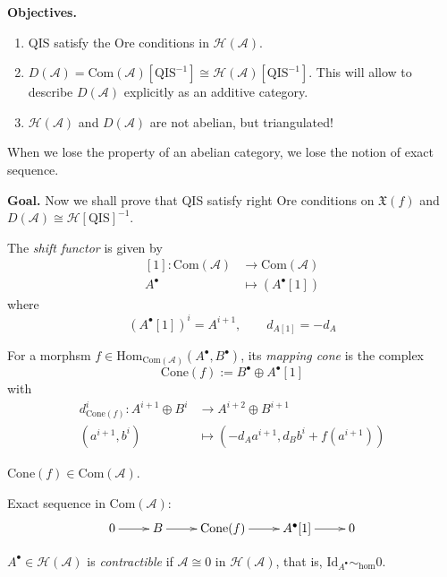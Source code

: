 {\bf Objectives.}
\begin{enumerate}
\item QIS satisfy the Ore conditions in
$\mathcal{H}(\mathcal{A})$.
\item
$D(\mathcal{A})=\text{Com}(\mathcal{A})
[\text{QIS}^{-1}]
\cong
\mathcal{H}(\mathcal{A})[\text{QIS}^{-1}]$.
This will allow to describe
$D(\mathcal{A})$ explicitly as an additive
category.
\item $\mathcal{H}(\mathcal{A})$ and
$D(\mathcal{A})$ are not abelian, but
triangulated!
\end{enumerate}

When we lose the property of an abelian
category, we lose the notion of exact
sequence.

{\bf Goal.} Now we shall prove that QIS
satisfy right Ore conditions on
$\mathfrak{X}(f)$ and $D(\mathcal{A})\cong
\mathcal{H}[\text{QIS}]^{-1}$.

\begin{definition}
\label{definition-shift-functor}
The {\it shift functor} is given by
$$
\begin{aligned}
[1]: \text{Com}(\mathcal{A}) &\longrightarrow
\text{Com}(\mathcal{A}) \\
A^\bullet &\longmapsto (A^\bullet[1])
\end{aligned}
$$
where
$$
(A^\bullet[1])^i=A^{i+1},\qquad
d_{A[1]}=-d_A
$$
\end{definition}

\begin{definition}
\label{definition-mapping-cone}
For a morphsm $f \in
\text{Hom}_{\text{Com}(\mathcal{A})
}(A^\bullet,B^{\bullet})$,
its {\it mapping
cone} is the complex
$$
\text{Cone}(f):=B^{\bullet}\oplus
A^{\bullet}[1]
$$
with
$$
\begin{aligned}
d_{\text{Cone}(f)}^i: A^{i+1}\oplus B^{i}
&\longrightarrow A^{i+2}\oplus B^{i+1} \\
(a^{i+1},b^i) &\longmapsto
(-d_Aa^{i+1},d_Bb^i+f(a^{i+1}))
\end{aligned}
$$
\end{definition}

\begin{exercise}
\label{exercise-cone-is-complex}
$\text{Cone}(f) \in \text{Com}(\mathcal{A})$.
\end{exercise}

Exact sequence in $\text{Com}(\mathcal{A})$:
$$
\xymatrix{
0\ar[r]&B\ar[r]&\text{Cone}(f)\ar[r]&
A^{\bullet}[1]\ar[r]&0
}
$$
\begin{definition}
\label{definition-contractible-complex}
$A^\bullet \in \mathcal{H}(\mathcal{A})$ is
{\it contractible} if $\mathcal{A}
\cong 0$ in $\mathcal{H}(\mathcal{A})$, that
is,
$\text{Id}_{A^{\bullet}}\sim_{\text{hom}}0$.
\end{definition}

